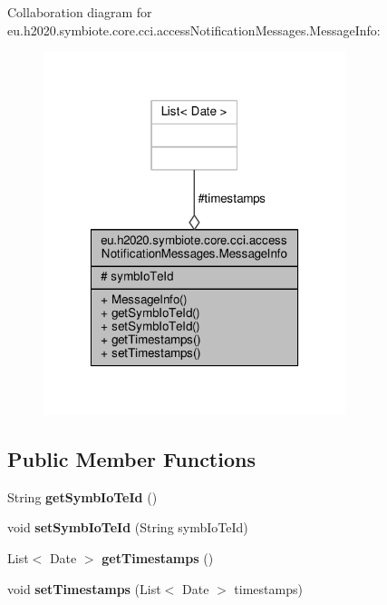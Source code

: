 Collaboration diagram for eu.\+h2020.\+symbiote.\+core.\+cci.\+access\+Notification\+Messages.\+Message\+Info\+:
\nopagebreak
\begin{figure}[H]
\begin{center}
\leavevmode
\includegraphics[width=250pt]{classeu_1_1h2020_1_1symbiote_1_1core_1_1cci_1_1accessNotificationMessages_1_1MessageInfo__coll__graph}
\end{center}
\end{figure}
\subsection*{Public Member Functions}
\begin{DoxyCompactItemize}
\item 
\mbox{\label{classeu_1_1h2020_1_1symbiote_1_1core_1_1cci_1_1accessNotificationMessages_1_1MessageInfo_aa826f4b97f195676e5fc3932af2d49a0}} 
String {\bfseries get\+Symb\+Io\+Te\+Id} ()
\item 
\mbox{\label{classeu_1_1h2020_1_1symbiote_1_1core_1_1cci_1_1accessNotificationMessages_1_1MessageInfo_ad4c77b9e73ab0c3a8fa992875b70e1e9}} 
void {\bfseries set\+Symb\+Io\+Te\+Id} (String symb\+Io\+Te\+Id)
\item 
\mbox{\label{classeu_1_1h2020_1_1symbiote_1_1core_1_1cci_1_1accessNotificationMessages_1_1MessageInfo_a8d4a9a8d426f70d7029868cbc14de97b}} 
List$<$ Date $>$ {\bfseries get\+Timestamps} ()
\item 
\mbox{\label{classeu_1_1h2020_1_1symbiote_1_1core_1_1cci_1_1accessNotificationMessages_1_1MessageInfo_a7504d132265fba1a82c03f8abb8a07e8}} 
void {\bfseries set\+Timestamps} (List$<$ Date $>$ timestamps)
\end{DoxyCompactItemize}
